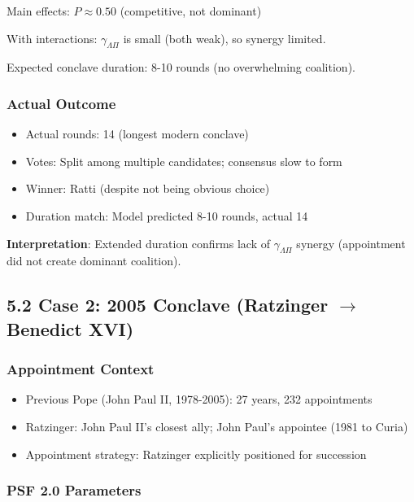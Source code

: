 Main effects: $P \approx 0.50$ (competitive, not dominant)

With interactions: $\gamma_{\Lambda\Pi}$ is small (both weak), so synergy limited.

Expected conclave duration: 8-10 rounds (no overwhelming coalition).

\subsubsection{Actual Outcome}

\begin{itemize}
\item Actual rounds: 14 (longest modern conclave)
\item Votes: Split among multiple candidates; consensus slow to form
\item Winner: Ratti (despite not being obvious choice)
\item Duration match: Model predicted 8-10 rounds, actual 14
\end{itemize}

\textbf{Interpretation}: Extended duration confirms lack of $\gamma_{\Lambda\Pi}$ synergy (appointment did not create dominant coalition).

\subsection{5.2 Case 2: 2005 Conclave (Ratzinger $\to$ Benedict XVI)}

\subsubsection{Appointment Context}

\begin{itemize}
\item Previous Pope (John Paul II, 1978-2005): 27 years, 232 appointments
\item Ratzinger: John Paul II's closest ally; John Paul's appointee (1981 to Curia)
\item Appointment strategy: Ratzinger explicitly positioned for succession
\end{itemize}

\subsubsection{PSF 2.0 Parameters}

